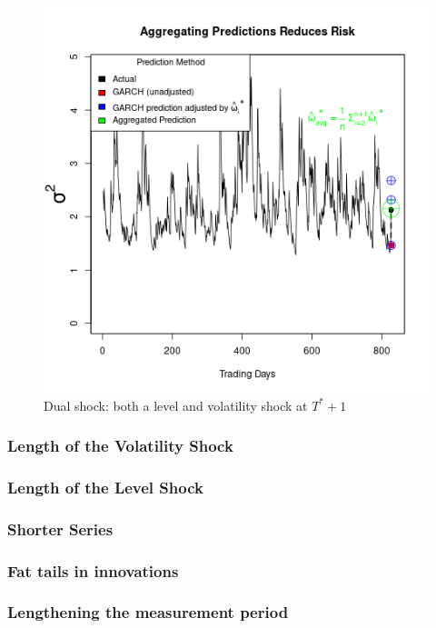 \documentclass[11pt]{article}
\theoremstyle{definition}
\begin{document}
\begin{figure}[h]
  \begin{center}
    \includegraphics[scale=.5]{simulation_plots/USE_in_paper_simulation_plot_arithmetic_mean.png}
    \caption{Dual shock: both a level and volatility shock at $T^{*}+1$}
    \label{fig:arith_mean}
    \end{center}
  \end{figure}

\subsubsection{Length of the Volatility Shock}

\subsubsection{Length of the Level Shock}

\subsubsection{Shorter Series}

\subsubsection{Fat tails in innovations}

\subsubsection{Lengthening the measurement period}
\end{document}
